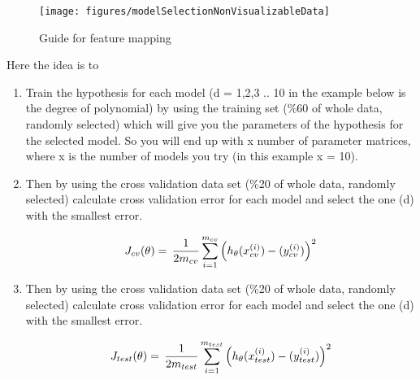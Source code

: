 \begin{landscape}
\begin{figure}
\begin{center}
\texttt{[image: figures/modelSelectionNonVisualizableData]}    %
\caption{Guide for feature mapping} 
\label{fig:modelSelection}
\end{center}
\end{figure}
\end{landscape}

Here the idea is to 

\begin{enumerate}
  \item Train the hypothesis for each model (d = 1,2,3 .. 10 in the 
example below is the degree of polynomial) by using the training set 
(\%60 of whole data, randomly selected) which will give you the 
parameters of the hypothesis for the selected model. So you 
will end up with x number of  parameter matrices, where x is 
the number of models you try (in this example x = 10).
  \item Then by using the cross validation data set (\%20 of whole 
data, randomly selected) calculate cross validation error for each 
model and select the one (d) with the smallest error.

\begin{equation}{\label{eqn:costFuncCrossVal}}
J_{cv}(\theta)
=\,
\frac{1}{2m_{cv}} \sum\limits_{i=1}^{m_{cv}} \Big(h_\theta(x_{cv}^{(i)}) - (y_{cv}^{(i)})\Big)^2  
\end{equation} 

  \item Then by using the cross validation data set (\%20 of whole 
data, randomly selected) calculate cross validation error for each 
model and select the one (d) with the smallest error.

\begin{equation}{\label{eqn:costFuncTest}}
J_{test}(\theta)
=\,
\frac{1}{2m_{test}} \sum\limits_{i=1}^{m_{test}} \Big(h_\theta(x_{test}^{(i)}) - (y_{test}^{(i)})\Big)^2  
\end{equation} 

\end{enumerate}


